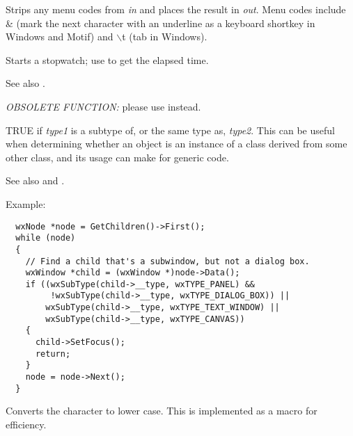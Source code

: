 

Strips any menu codes from {\it in} and places the result
in {\it out}. Menu codes include \& (mark the next character with an underline
as a keyboard shortkey in Windows and Motif) and $\backslash$t (tab in Windows).

\label{wxstarttimer}


Starts a stopwatch; use  to get the elapsed time.

See also .

\label{wxsubtype}


{\it OBSOLETE FUNCTION:} please use  instead.

TRUE if {\it type1} is a subtype of, or the same type as, {\it type2}. This can
be useful when determining whether an object is an instance of a class derived from
some other class, and its usage can make for generic code.

See also  and .

Example:

\begin{verbatim}
  wxNode *node = GetChildren()->First();
  while (node)
  {
    // Find a child that's a subwindow, but not a dialog box.
    wxWindow *child = (wxWindow *)node->Data();
    if ((wxSubType(child->__type, wxTYPE_PANEL) &&
         !wxSubType(child->__type, wxTYPE_DIALOG_BOX)) ||
        wxSubType(child->__type, wxTYPE_TEXT_WINDOW) ||
        wxSubType(child->__type, wxTYPE_CANVAS))
    {
      child->SetFocus();
      return;
    }
    node = node->Next();
  }
\end{verbatim}

\label{wxtolower}


Converts the character to lower case. This is implemented as a macro for efficiency.

\label{wxtoupper}

